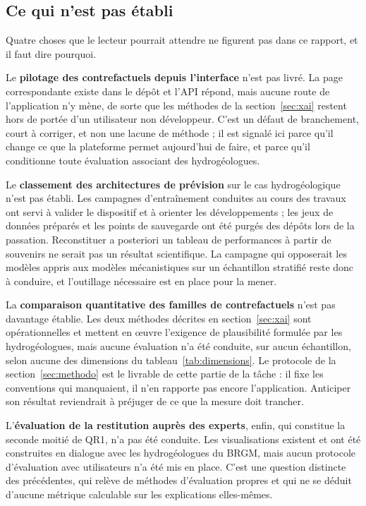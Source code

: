 \subsection{Ce qui n'est pas établi}

Quatre choses que le lecteur pourrait attendre ne figurent pas dans ce rapport, et il faut dire pourquoi.

Le \textbf{pilotage des contrefactuels depuis l'interface} n'est pas livré. La page correspondante existe dans le dépôt et l'API répond, mais aucune route de l'application n'y mène, de sorte que les méthodes de la section~\ref{sec:xai} restent hors de portée d'un utilisateur non développeur. C'est un défaut de branchement, court à corriger, et non une lacune de méthode ; il est signalé ici parce qu'il change ce que la plateforme permet aujourd'hui de faire, et parce qu'il conditionne toute évaluation associant des hydrogéologues.

Le \textbf{classement des architectures de prévision} sur le cas hydrogéologique n'est pas établi. Les campagnes d'entraînement conduites au cours des travaux ont servi à valider le dispositif et à orienter les développements ; les jeux de données préparés et les points de sauvegarde ont été purgés des dépôts lors de la passation. Reconstituer a posteriori un tableau de performances à partir de souvenirs ne serait pas un résultat scientifique. La campagne qui opposerait les modèles appris aux modèles mécanistiques sur un échantillon stratifié reste donc à conduire, et l'outillage nécessaire est en place pour la mener.

La \textbf{comparaison quantitative des familles de contrefactuels} n'est pas davantage établie. Les deux méthodes décrites en section~\ref{sec:xai} sont opérationnelles et mettent en œuvre l'exigence de plausibilité formulée par les hydrogéologues, mais aucune évaluation n'a été conduite, sur aucun échantillon, selon aucune des dimensions du tableau~\ref{tab:dimensions}. Le protocole de la section~\ref{sec:methodo} est le livrable de cette partie de la tâche : il fixe les conventions qui manquaient, il n'en rapporte pas encore l'application. Anticiper son résultat reviendrait à préjuger de ce que la mesure doit trancher.

L'\textbf{évaluation de la restitution auprès des experts}, enfin, qui constitue la seconde moitié de QR1, n'a pas été conduite. Les visualisations existent et ont été construites en dialogue avec les hydrogéologues du BRGM, mais aucun protocole d'évaluation avec utilisateurs n'a été mis en place. C'est une question distincte des précédentes, qui relève de méthodes d'évaluation propres et qui ne se déduit d'aucune métrique calculable sur les explications elles-mêmes.

